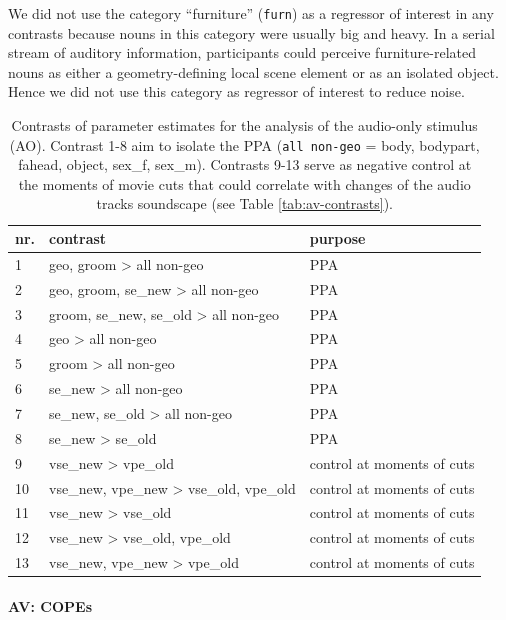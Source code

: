 \documentclass[english]{article}
\begin{document}
We did not use the category ``furniture'' (\texttt{furn}) as a
regressor of interest in any contrasts because nouns in this category were
usually big and heavy. In a serial stream of auditory information, participants
could perceive furniture-related nouns as either a geometry-defining local scene
element or as an isolated object. Hence we did not use this category as
regressor of interest to reduce noise.


\begin{table}[t]
\caption{Contrasts of parameter estimates for the analysis of the audio-only stimulus (AO).
Contrast 1-8 aim to isolate the PPA (\texttt{all non-geo} = body, bodypart,
    fahead, object, sex\_f, sex\_m).
Contrasts 9-13 serve as negative control at the moments of movie cuts that could
    correlate with changes of the audio tracks soundscape (see Table \ref{tab:av-contrasts}).}

\label{tab:ao-contrasts}
\footnotesize
\begin{tabular}{lll}
\toprule
\textbf{nr.} &  \textbf{contrast} & \textbf{purpose} \\
\midrule
1 & geo, groom > all non-geo & PPA \tabularnewline
2 & geo, groom, se\_new > all non-geo & PPA \tabularnewline
3 & groom, se\_new, se\_old > all non-geo & PPA \tabularnewline
4 & geo > all non-geo & PPA \tabularnewline
5 & groom > all non-geo & PPA \tabularnewline
6 & se\_new > all non-geo & PPA \tabularnewline
7 & se\_new, se\_old > all non-geo & PPA \tabularnewline
8 & se\_new > se\_old & PPA \tabularnewline
9 & vse\_new > vpe\_old & control at moments of cuts \tabularnewline
10 & vse\_new, vpe\_new > vse\_old, vpe\_old & control at moments of cuts \tabularnewline
11 & vse\_new > vse\_old & control at moments of cuts \tabularnewline
12 & vse\_new > vse\_old, vpe\_old & control at moments of cuts \tabularnewline
13 & vse\_new, vpe\_new > vpe\_old & control at moments of cuts \tabularnewline
\end{tabular}
\end{table}


\paragraph{AV: COPEs}

\end{document}
